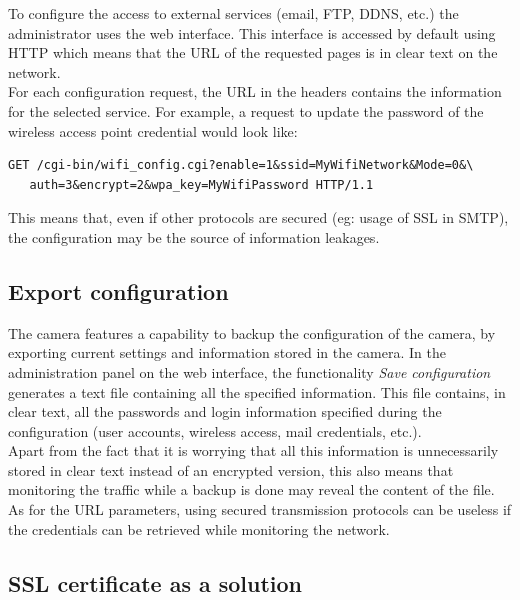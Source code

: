 To configure the access to external services (email, FTP, DDNS, etc.) the administrator uses the web interface.
This interface is accessed by default using HTTP which means that the URL of the requested pages is in clear text on the network.\\

For each configuration request, the URL in the headers contains the information for the selected service.
For example, a request to update the password of the wireless access point credential would look like:
{\scriptsize
\begin{verbatim}
GET /cgi-bin/wifi_config.cgi?enable=1&ssid=MyWifiNetwork&Mode=0&\
   auth=3&encrypt=2&wpa_key=MyWifiPassword HTTP/1.1
\end{verbatim}
}

This means that, even if other protocols are secured (eg: usage of SSL in SMTP), the configuration may be the source of information leakages.\\

\subsection{Export configuration}
\label{sec:dcs-config}

The camera features a capability to backup the configuration of the camera, by exporting current settings and information stored in the camera.
In the administration panel on the web interface, the functionality \emph{Save configuration} generates a text file containing all the specified information.
This file contains, in clear text, all the passwords and login information specified during the configuration (user accounts, wireless access, mail credentials, etc.).\\

Apart from the fact that it is worrying that all this information is unnecessarily stored in clear text instead of an encrypted version, this also means that monitoring the traffic while a backup is done may reveal the content of the file.
As for the URL parameters, using secured transmission protocols can be useless if the credentials can be retrieved while monitoring the network.

\subsection{SSL certificate as a solution}

